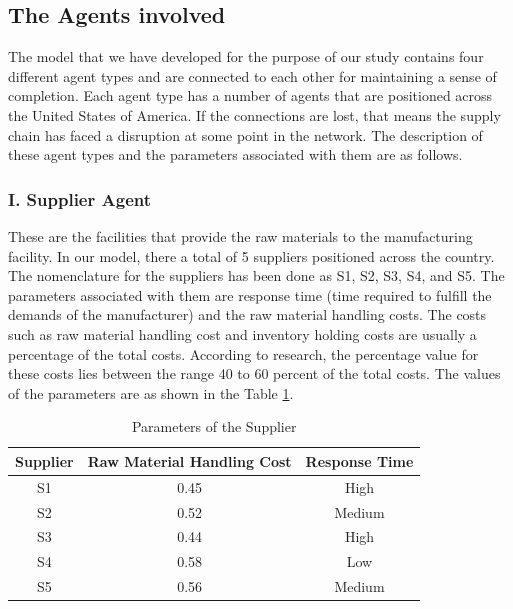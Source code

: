\subsection{The Agents involved}

The model that we have developed for the purpose of our study contains four different agent types and are connected to each other for maintaining a sense of completion. Each agent type has a number of agents that are positioned across the United States of America. If the connections are lost, that means the supply chain has faced a disruption at some point in the network. The description of these agent types and the parameters associated with them are as follows.

\subsubsection{I. Supplier Agent}

These are the facilities that provide the raw materials to the manufacturing facility. In our model, there a total of 5 suppliers positioned across the country. The nomenclature for the suppliers has been done as S1, S2, S3, S4, and S5. The parameters associated with them are response time (time required to fulfill the demands of the manufacturer) and the raw material handling costs. The costs such as raw material handling cost and inventory holding costs are usually a percentage of the total costs. According to research, the percentage value for these costs lies between the range 40 to 60 percent of the total costs. The values of the parameters are as shown in the Table \ref{tab:Supplier}.

\begin{table}[H]
\caption{Parameters of the Supplier}
\label{tab:Supplier}
\begin{center}
\begin{tabular}[b]{|c|c|c|}
	\hline
	Supplier & Raw Material Handling Cost & Response Time \\ \hline
	S1 & 0.45 & High\\ \hline
	S2 & 0.52 & Medium \\ \hline
	S3 & 0.44 & High \\ \hline
	S4 & 0.58 & Low \\ \hline
	S5 & 0.56 & Medium \\ \hline
\end{tabular}
\end{center}
\end{table}

